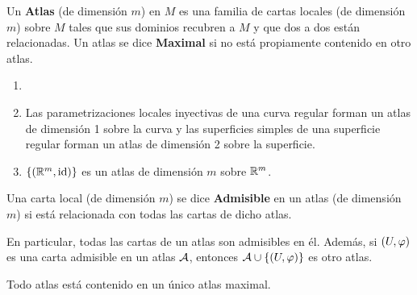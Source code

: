 \documentclass[cursovd_portada.tex]{subfiles}
\begin{document}
\begin{defi}
Un {\bf Atlas} (de dimensión $m$) en $M$ es una familia de cartas locales (de dimensión $m$) sobre $M$ tales que
sus dominios recubren a $M$ y que dos a dos están relacionadas. Un atlas se dice {\bf Maximal} si no está
propiamente contenido en otro atlas.
\end{defi}
\begin{ej}
{\rm
\begin{enumerate}
\item[]
\item Las parametrizaciones locales inyectivas de una curva regular forman un atlas de dimensión 1 sobre la curva y las
superficies simples de una superficie regular forman un atlas de dimensión 2 sobre la superficie.
\item $\{(\mathbb{R}^m,{\rm id})\}$ es un atlas de dimensión $m$ sobre $\mathbb{R}^m$.
\end{enumerate}}
\end{ej}
\begin{defi}
Una carta local (de dimensión $m$) se dice {\bf Admisible} en un atlas (de dimensión $m$) si está relacionada con
todas las cartas de dicho atlas.
\end{defi}
En particular, todas las cartas de un atlas son admisibles en él. Además, si $(U,\varphi)$ es una carta admisible en
un atlas ${\cal A}$, entonces ${\cal A}\cup\{(U,\varphi)\}$ es otro atlas.
\begin{prop}
Todo atlas está contenido en un único atlas maximal.
\end{prop}
\end{document}

